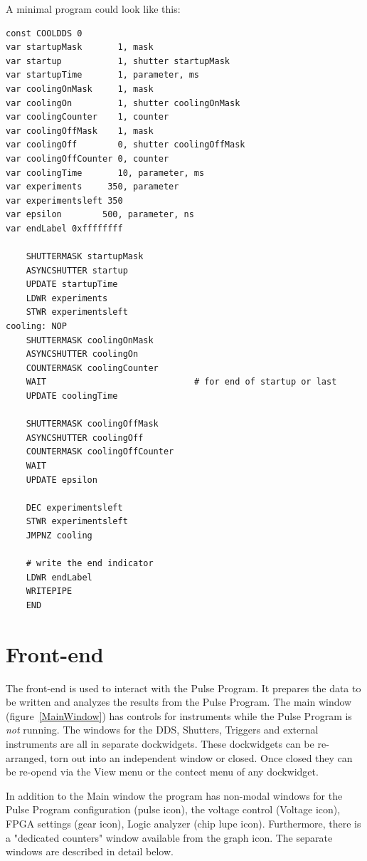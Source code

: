 \documentclass[11pt]{scrartcl}
\begin{document}
A minimal program could look like this:
\begin{lstlisting}
const COOLDDS 0
var startupMask       1, mask
var startup           1, shutter startupMask
var startupTime       1, parameter, ms
var coolingOnMask     1, mask
var coolingOn         1, shutter coolingOnMask
var coolingCounter    1, counter
var coolingOffMask    1, mask
var coolingOff        0, shutter coolingOffMask
var coolingOffCounter 0, counter
var coolingTime       10, parameter, ms
var experiments     350, parameter
var experimentsleft 350
var epsilon        500, parameter, ns
var endLabel 0xffffffff

	SHUTTERMASK startupMask
	ASYNCSHUTTER startup
	UPDATE startupTime
	LDWR experiments
	STWR experimentsleft
cooling: NOP
	SHUTTERMASK coolingOnMask
	ASYNCSHUTTER coolingOn
	COUNTERMASK coolingCounter
	WAIT                             # for end of startup or last
	UPDATE coolingTime

	SHUTTERMASK coolingOffMask
	ASYNCSHUTTER coolingOff
	COUNTERMASK coolingOffCounter
	WAIT
	UPDATE epsilon

	DEC experimentsleft
	STWR experimentsleft
	JMPNZ cooling	

	# write the end indicator
	LDWR endLabel
	WRITEPIPE	
	END

\end{lstlisting}


\section{Front-end}
The front-end is used to interact with the Pulse Program. It prepares the data to be written and analyzes the results from the Pulse Program. The main window (figure~\ref{MainWindow}) has controls for instruments while the Pulse Program is {\em not} running. The windows for the DDS, Shutters, Triggers and external instruments are all in separate dockwidgets. These dockwidgets can be re-arranged, torn out into an independent window or closed. Once closed they can be re-opend via the View menu or the contect menu of any dockwidget.

In addition to the Main window the program has non-modal windows for the Pulse Program configuration (pulse icon), the voltage control (Voltage icon), FPGA settings (gear icon), Logic analyzer (chip lupe icon). Furthermore, there is a "dedicated counters" window available from the graph icon. The separate windows are described in detail below.
\end{document}

